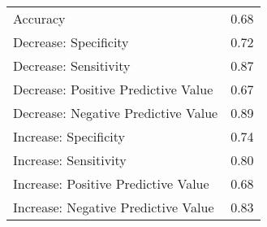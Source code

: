 \begin{table}[ht]
\centering
\begin{tabular}{lr}
  \hline
 &  \\ 
  \hline
Accuracy & 0.68 \\ 
  Decrease: Specificity & 0.72 \\ 
  Decrease: Sensitivity & 0.87 \\ 
  Decrease: Positive Predictive Value & 0.67 \\ 
  Decrease: Negative Predictive Value & 0.89 \\ 
  Increase: Specificity & 0.74 \\ 
  Increase: Sensitivity & 0.80 \\ 
  Increase: Positive Predictive Value & 0.68 \\ 
  Increase: Negative Predictive Value & 0.83 \\ 
   \hline
\end{tabular}
\end{table}
